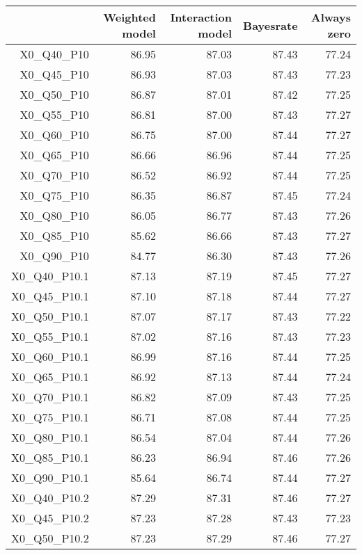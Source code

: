 \begin{table}[ht]
\centering
\begin{tabular}{rrrrr}
  \hline
 & Weighted model & Interaction model & Bayesrate & Always zero \\ 
  \hline
X0\_Q40\_P10 & 86.95 & 87.03 & 87.43 & 77.24 \\ 
  X0\_Q45\_P10 & 86.93 & 87.03 & 87.43 & 77.23 \\ 
  X0\_Q50\_P10 & 86.87 & 87.01 & 87.42 & 77.25 \\ 
  X0\_Q55\_P10 & 86.81 & 87.00 & 87.43 & 77.27 \\ 
  X0\_Q60\_P10 & 86.75 & 87.00 & 87.44 & 77.27 \\ 
  X0\_Q65\_P10 & 86.66 & 86.96 & 87.44 & 77.25 \\ 
  X0\_Q70\_P10 & 86.52 & 86.92 & 87.44 & 77.25 \\ 
  X0\_Q75\_P10 & 86.35 & 86.87 & 87.45 & 77.24 \\ 
  X0\_Q80\_P10 & 86.05 & 86.77 & 87.43 & 77.26 \\ 
  X0\_Q85\_P10 & 85.62 & 86.66 & 87.43 & 77.27 \\ 
  X0\_Q90\_P10 & 84.77 & 86.30 & 87.43 & 77.26 \\ 
  X0\_Q40\_P10.1 & 87.13 & 87.19 & 87.45 & 77.27 \\ 
  X0\_Q45\_P10.1 & 87.10 & 87.18 & 87.44 & 77.27 \\ 
  X0\_Q50\_P10.1 & 87.07 & 87.17 & 87.43 & 77.22 \\ 
  X0\_Q55\_P10.1 & 87.02 & 87.16 & 87.43 & 77.23 \\ 
  X0\_Q60\_P10.1 & 86.99 & 87.16 & 87.44 & 77.25 \\ 
  X0\_Q65\_P10.1 & 86.92 & 87.13 & 87.44 & 77.24 \\ 
  X0\_Q70\_P10.1 & 86.82 & 87.09 & 87.43 & 77.25 \\ 
  X0\_Q75\_P10.1 & 86.71 & 87.08 & 87.44 & 77.25 \\ 
  X0\_Q80\_P10.1 & 86.54 & 87.04 & 87.44 & 77.26 \\ 
  X0\_Q85\_P10.1 & 86.23 & 86.94 & 87.46 & 77.26 \\ 
  X0\_Q90\_P10.1 & 85.64 & 86.74 & 87.44 & 77.27 \\ 
  X0\_Q40\_P10.2 & 87.29 & 87.31 & 87.46 & 77.27 \\ 
  X0\_Q45\_P10.2 & 87.23 & 87.28 & 87.43 & 77.23 \\ 
  X0\_Q50\_P10.2 & 87.23 & 87.29 & 87.46 & 77.27 \\ 

\end{tabular}
\end{table}
